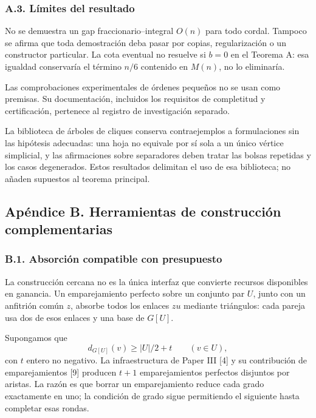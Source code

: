 \documentclass[spanish,11pt,a4paper]{article}
\begin{document}
\subsubsection{A.3. Límites del resultado}\label{a.3.-limites-del-resultado}

No se demuestra un gap fraccionario--integral \(O(n)\) para todo cordal. Tampoco se afirma que toda demostración deba pasar por copias, regularización o un constructor particular. La cota eventual no resuelve si \(b=0\) en el Teorema A: esa igualdad conservaría el término \(n/6\) contenido en \(M(n)\), no lo eliminaría.

Las comprobaciones experimentales de órdenes pequeños no se usan como premisas. Su documentación, incluidos los requisitos de completitud y certificación, pertenece al registro de investigación separado.

La biblioteca de árboles de cliques conserva contraejemplos a formulaciones sin las hipótesis adecuadas: una hoja no equivale por sí sola a un único vértice simplicial, y las afirmaciones sobre separadores deben tratar las bolsas repetidas y los casos degenerados. Estos resultados delimitan el uso de esa biblioteca; no añaden supuestos al teorema principal.

\subsection{Apéndice B. Herramientas de construcción complementarias}\label{apendice-b.-herramientas-de-construccion-complementarias}

\subsubsection{B.1. Absorción compatible con presupuesto}\label{b.1.-absorcion-compatible-con-presupuesto}

La construcción cercana no es la única interfaz que convierte recursos disponibles en ganancia. Un emparejamiento perfecto sobre un conjunto par \(U\), junto con un anfitrión común \(z\), absorbe todos los enlaces \(zu\) mediante triángulos: cada pareja usa dos de esos enlaces y una base de \(G[U]\).

Supongamos que \[
d_{G[U]}(v)\ge |U|/2+t\qquad(v\in U),
\tag{B.1}
\] con \(t\) entero no negativo. La infraestructura de Paper III {[}4{]} y su contribución de emparejamientos {[}9{]} producen \(t+1\) emparejamientos perfectos disjuntos por aristas. La razón es que borrar un emparejamiento reduce cada grado exactamente en uno; la condición de grado sigue permitiendo el siguiente hasta completar esas rondas.
\end{document}
